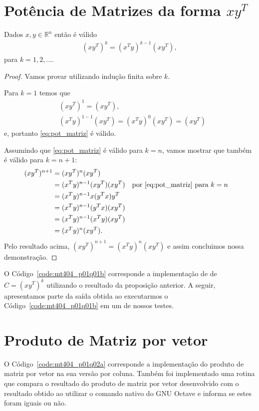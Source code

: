 \documentclass[12pt,a4paper]{article}
\begin{document}
\section{Pot\^{e}ncia de Matrizes da forma $xy^T$}
\begin{prop}
    Dados $x, y \in \mathbb{R}^n$ então é válido
    \begin{align}
        (x y^T)^k = (x^T y)^{k - 1} (x y^T), \label{eq:pot_matriz}
    \end{align}
para $k = 1, 2, \ldots$.
\end{prop}
\begin{proof}
    Vamos provar utilizando indução finita sobre $k$.
    
    Para $k = 1$ temos que
    \begin{align*}
        & (x y^T)^1 = (x y^T), \\
        & (x^T y)^{1 - 1} (x y^T) = (x^T y)^0 (x y^T) = (x y^T)
    \end{align*}
    e, portanto \eqref{eq:pot_matriz} é válido.
    
    Assumindo que \eqref{eq:pot_matriz} é válido para $k = n$, vamos mostrar que também é válido para $k = n + 1$:
    \begin{align*}
        (x y^T)^{n + 1} &= (x y^T)^n (x y^T)  \\
        &= (x^T y)^{n - 1} (x y^T) (x y^T) && \text{por \eqref{eq:pot_matriz} para $k = n$}\\
        &= (x^T y)^{n - 1} x (y^T x) y^T \\
        &= (x^T y)^{n - 1} (y^T x) (x y^T) \\
        &= (x^T y)^{n - 1} (x^T y) (x y^T) \\
        &= (x^T y)^{n} (x y^T).
    \end{align*}
    Pelo resultado acima, $(x y^T)^{n + 1} = (x^T y)^{n} (x y^T)$ e assim concluimos nossa demonstração.
\end{proof}

O Código~\ref{code:mt404_p01q01b} corresponde a implementação de de $C = (x y^T)^k$ utilizando o resultado da proposição anterior. A seguir, apresentamos parte da saída obtida ao executarmos o Código~\ref{code:mt404_p01q01b} em um de nossos testes.


\section{Produto de Matriz por vetor}
O Código~\ref{code:mt404_p01q02a} corresponde a implementação do produto de matriz por vetor na sua versão por coluna. Também foi implementado uma rotina que compara o resultado do produto de matriz por vetor desenvolvido com o resultado obtido ao utilizar o comando nativo do GNU Octave e informa se estes foram iguais ou não.
\end{document}

